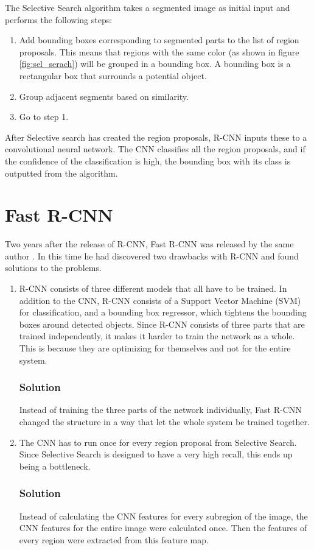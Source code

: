 \noindent
The Selective Search algorithm takes a segmented image as initial input and performs the following steps:
\begin{enumerate}
  \item Add bounding boxes corresponding to segmented parts to the list of region proposals. This means that regions with the same color (as shown in figure \ref{fig:sel_serach}) will be grouped in a bounding box. A bounding box is a rectangular box that surrounds a potential object.
  \item Group adjacent segments based on similarity.
  \item Go to step 1.
\end{enumerate}

\noindent
After Selective search has created the region proposals, R-CNN inputs these to a convolutional neural network. The CNN classifies all the region proposals, and if the confidence of the classification is high, the bounding box with its class is outputted from the algorithm. 


\section{Fast R-CNN}

Two years after the release of R-CNN, Fast R-CNN was released by the same author  \citep{FastR-CNN}. In this time he had discovered two drawbacks with R-CNN and found solutions to the problems. 

\begin{enumerate}
    \item R-CNN consists of three different models that all have to be trained. In addition to the CNN, R-CNN consists of a Support Vector Machine (SVM) for classification, and a bounding box regressor, which tightens the bounding boxes around detected objects. Since R-CNN consists of three parts that are trained independently, it makes it harder to train the network as a whole. This is because they are optimizing for themselves and not for the entire system. 
    \subsubsection{Solution}
Instead of training the three parts of the network individually, Fast R-CNN changed the structure in a way that let the whole system be trained together.
     
    \item The CNN has to run once for every region proposal from Selective Search. Since Selective Search is designed to have a very high recall, this ends up being a bottleneck. 
    \subsubsection{Solution}
Instead of calculating the CNN features for every subregion of the image, the CNN features for the entire image were calculated once. Then the features of every region were extracted from this feature map.
\end{enumerate}







